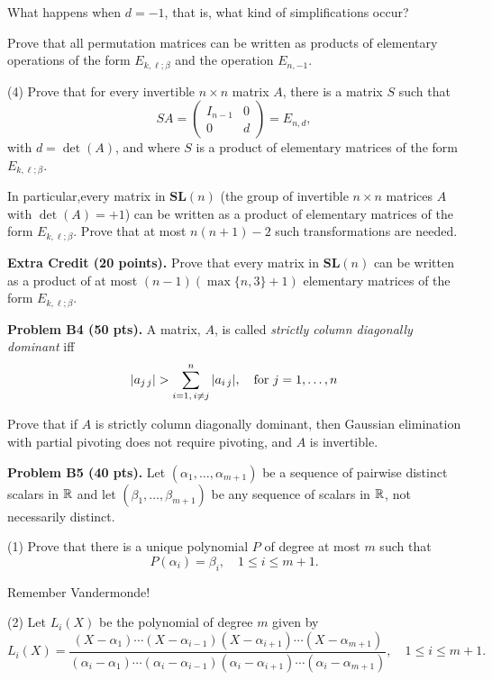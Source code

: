 \documentclass[12pt]{article}
\begin{document}
What happens when $d = -1$, that is, what kind of simplifications occur?


\medskip
Prove that all permutation matrices can be written as products
of elementary operations of the form  $E_{k,\ell; \beta}$ 
and the operation $E_{n, -1}$.

\medskip
(4)
Prove that for every invertible $n\times n$ matrix $A$, there is
a matrix $S$ such that
\[
S A = 
\begin{pmatrix}
I_{n - 1} & 0 \\
0 & d
\end{pmatrix}
= E_{n, d},
\]
with $d = \det(A)$, and where $S$ is a product of elementary 
matrices of the form  $E_{k,\ell; \beta}$.

\medskip
In particular,every matrix in $\mathbf{SL}(n)$
(the group of invertible $n\times n$ matrices $A$ with
$\det(A) = +1$) can be written as a product of
elementary 
matrices of the form  $E_{k,\ell; \beta}$.
Prove that at most $n(n + 1) - 2$ such transformations are needed.

\vspace {0.25cm}\noindent
{\bf Extra Credit (20 points).}
Prove that every matrix in $\mathbf{SL}(n)$
can be written as a product of at most
$(n  - 1)(\max\{n, 3\} + 1)$
elementary   matrices of the form  $E_{k,\ell; \beta}$.


\vspace {0.25cm}\noindent
{\bf Problem B4 (50 pts).}
A matrix, $A$, is called {\it strictly column diagonally dominant\/}
iff
\[
|a_{j\, j}| > \sum_{i = 1,\, i\not= j}^{n} |a_{i\, j}|,
\quad\hbox{for $j = 1, \ldots, n$}
\]

Prove that if $A$ is  strictly column diagonally dominant, then
Gaussian elimination with partial pivoting does not require pivoting, and 
$A$ is invertible.



\vspace {0.25cm}\noindent
{\bf Problem B5 (40 pts).}
Let $(\alpha_1, \ldots, \alpha_{m + 1})$ be a sequence of pairwise distinct
scalars in ${\mathbb R}$ and let $(\beta_1, \ldots, \beta_{m + 1})$ be any 
sequence of scalars in ${\mathbb R}$, not necessarily distinct.

\medskip
(1)
Prove that there is a unique polynomial $P$ of degree at most $m$
such that
\[
P(\alpha_i) = \beta_i, \quad 1\leq i \leq m + 1. 
\]

\medskip
\hint
Remember Vandermonde!

\medskip
(2)
Let $L_i(X)$ be the polynomial of degree $m$ given by
\[
L_i(X) = \frac{(X - \alpha_1)\cdots (X - \alpha_{i - 1}) (X - \alpha_{i + 1})
\cdots (X - \alpha_{m + 1})}
  {(\alpha_i - \alpha_1)\cdots (\alpha_i - \alpha_{i - 1}) 
(\alpha_i - \alpha_{i + 1}) \cdots (\alpha_i - \alpha_{m + 1})},
\quad 1 \leq i \leq m + 1.
\]
\end{document}

